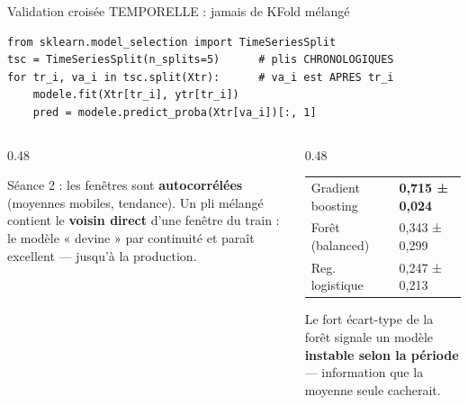 \begin{frame}[fragile]{Validation croisée TEMPORELLE : jamais de KFold mélangé}
\begin{codebox}
\begin{lstlisting}
from sklearn.model_selection import TimeSeriesSplit
tsc = TimeSeriesSplit(n_splits=5)      # plis CHRONOLOGIQUES
for tr_i, va_i in tsc.split(Xtr):      # va_i est APRES tr_i
    modele.fit(Xtr[tr_i], ytr[tr_i])
    pred = modele.predict_proba(Xtr[va_i])[:, 1]
\end{lstlisting}
\end{codebox}
\begin{columns}[t]
\begin{column}{0.48\textwidth}
\begin{wbox}
Séance 2 : les fenêtres sont \textbf{autocorrélées} (moyennes
mobiles, tendance). Un pli mélangé contient le \textbf{voisin
direct} d'une fenêtre du train : le modèle « devine » par
continuité et paraît excellent --- jusqu'à la production.
\end{wbox}
\end{column}
\begin{column}{0.48\textwidth}
\begin{ebox}
\begin{center}\small
\begin{tabular}{@{}l l@{}}
\toprule
Gradient boosting & \textbf{0,715 ± 0,024}\\
Forêt (balanced) & 0,343 ± 0,299\\
Reg. logistique & 0,247 ± 0,213\\
\bottomrule
\end{tabular}
\end{center}
Le fort écart-type de la forêt signale un modèle
\textbf{instable selon la période} --- information que la moyenne
seule cacherait.
\end{ebox}
\end{column}
\end{columns}
\end{frame}

